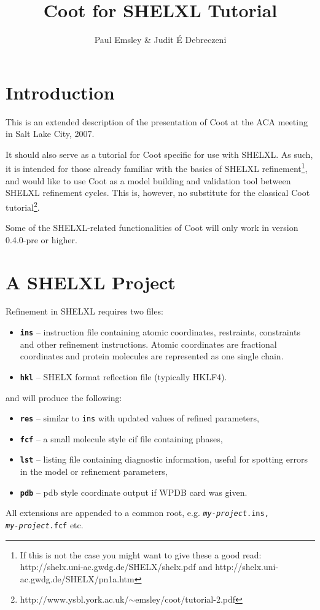 \documentclass{article}
\begin{document}
\title{Coot for SHELXL Tutorial}
\author{Paul Emsley \& Judit \'{E} Debreczeni}

\maketitle
\tableofcontents

\pagebreak
\section{Introduction}

This is an extended description of the presentation of Coot at the ACA
meeting in Salt Lake City, 2007.

It should also serve as a tutorial for Coot specific for use with
SHELXL. As such, it is intended for those already familiar with the
basics of SHELXL refinement\footnote{If this is not the case you might
  want to give these a good
  read:\\http://shelx.uni-ac.gwdg.de/SHELX/shelx.pdf and
  http://shelx.uni-ac.gwdg.de/SHELX/pn1a.htm}, and would like to use
Coot as a model building and validation tool between SHELXL refinement
cycles. This is, however, no substitute for the classical Coot
tutorial\footnote{http://www.ysbl.york.ac.uk/$\sim$emsley/coot/tutorial-2.pdf}.

Some of the SHELXL-related functionalities of Coot will only work in
version 0.4.0-pre or higher.

\section{A SHELXL Project}
Refinement in SHELXL requires two files:
\begin{itemize}
\item {\bf \texttt{ins}} -- instruction file containing atomic
  coordinates, restraints, constraints and other refinement
  instructions. Atomic coordinates are fractional coordinates and
  protein molecules are represented as one single chain.
\item {\bf \texttt{hkl}} -- SHELX format reflection file (typically HKLF4).
\end{itemize}
and will produce the following:
\begin{itemize}
\item {\bf \texttt{res}} -- similar to \texttt{ins} with updated
  values of refined parameters,
\item {\bf \texttt{fcf}} -- a small molecule style cif file containing
  phases,
\item {\bf \texttt{lst}} -- listing file containing diagnostic
  information, useful for spotting errors in the model or refinement
  parameters,
\item {\bf \texttt{pdb}} -- pdb style coordinate output if WPDB card was given.
\end{itemize}
All extensions are appended to a common root, e.g. \texttt{\emph{my-project}.ins,\\\emph{my-project}.fcf} etc.
\end{document}
